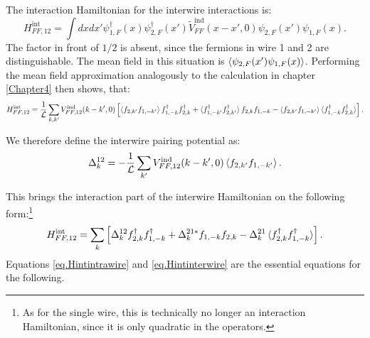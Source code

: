 The interaction Hamiltonian for the interwire interactions is:
\begin{equation}
H^\text{int}_{FF,12} = \int dx dx' \psi^\dagger_{1,F}(x)\psi^\dagger_{2,F}(x') \tilde{V}^\text{ind}_{FF}(x-x',0) \psi_{2,F}(x')\psi_{1,F}(x).
\end{equation}
The factor in front of $1/2$ is absent, since the fermions in wire 1 and 2 are distinguishable. The mean field in this situation is $\braket{\psi_{2,F}(x')\psi_{1,F}(x)}$. Performing the mean field approximation analogously to the calculation in chapter \ref{Chapter4} then shows, that:
\begin{equation}
H^\text{int}_{FF,12} = \frac{1}{\mathcal{L}} \sum_{k,k'} V^\text{ind}_{FF,12}(k-k',0)\left[\braket{f_{2,k'}f_{1,-k'}}f^\dagger_{1,-k}f^\dagger_{2,k} + \braket{f^\dagger_{1,-k'}f^\dagger_{2,k'}}f_{2,k}f_{1,-k} - \braket{f_{2,k'}f_{1,-k'}}\braket{f^\dagger_{1,-k}f^\dagger_{2,k}} \right].
\end{equation}

We therefore define the interwire pairing potential as:
\begin{equation}
\Delta^{12}_k = -\frac{1}{\mathcal{L}} \sum_{k'} V^\text{ind}_{FF,12}(k-k',0)\braket{f_{2,k'}f_{1,-k'}}.
\end{equation}

This brings the interaction part of the interwire Hamiltonian on the following form:\footnote{As for the single wire, this is technically no longer an interaction Hamiltonian, since it is only quadratic in the operators.}
\begin{equation}
H^\text{int}_{FF,12} = \sum_{k} \left[\Delta^{12}_k f^\dagger_{2,k}f^\dagger_{1,-k} + \Delta^{21 *}_k f_{1,-k}f_{2,k} - \Delta^{21}_k\braket{f^\dagger_{2,k}f^\dagger_{1,-k}} \right].
\label{eq.Hintinterwire}
\end{equation}
Equations \ref{eq.Hintintrawire} and \ref{eq.Hintinterwire} are the essential equations for the following. 

